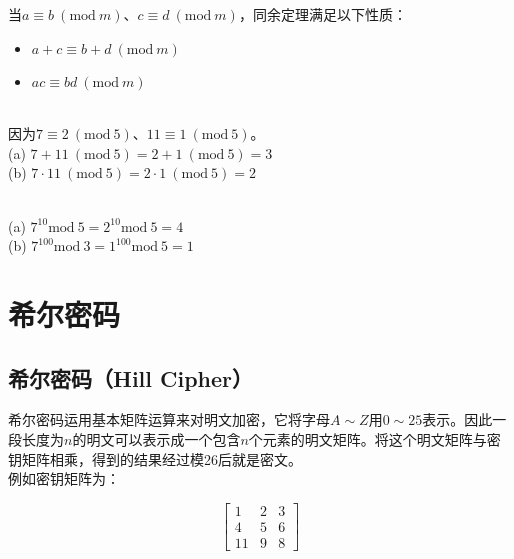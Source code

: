 \vspace{0.5cm}

当$ a \equiv b\ (\text{mod}\ m) $、$ c \equiv d\ (\text{mod}\ m) $，同余定理满足以下性质：

\begin{itemize}
    \item $ a + c \equiv b + d\ (\text{mod}\ m) $
    \item $ ac \equiv bd\ (\text{mod}\ m) $
\end{itemize}

\vspace{0.5cm}

\begin{tcolorbox}
    \\
    因为$ 7 \equiv 2\ (\text{mod}\ 5) $、$ 11 \equiv 1\ (\text{mod}\ 5) $。\\
    (a) $ 7 + 11\ (\text{mod}\ 5) = 2 + 1 \ (\text{mod}\ 5) = 3 $\\
    (b) $ 7 \cdot 11\ (\text{mod}\ 5) = 2 \cdot 1 \ (\text{mod}\ 5) = 2 $
\end{tcolorbox}

\vspace{0.5cm}

\begin{tcolorbox}
    \\
    (a) $ 7^{10} \text{mod}\ 5 = 2^{10} \text{mod}\ 5 = 4 $\\
    (b) $ 7^{100} \text{mod}\ 3 = 1^{100} \text{mod}\ 5 = 1 $
\end{tcolorbox}

\newpage

\section{希尔密码}

\subsection{希尔密码（Hill Cipher）}

希尔密码运用基本矩阵运算来对明文加密，它将字母$ A \sim Z $用$ 0 \sim 25 $表示。因此一段长度为$ n $的明文可以表示成一个包含$ n $个元素的明文矩阵。将这个明文矩阵与密钥矩阵相乘，得到的结果经过模26后就是密文。\\

例如密钥矩阵为：

\[
    \begin{bmatrix}
        1  & 2 & 3 \\
        4  & 5 & 6 \\
        11 & 9 & 8
    \end{bmatrix}
\]


